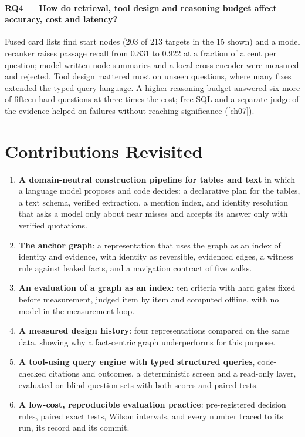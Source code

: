\paragraph{RQ4 --- How do retrieval, tool design and reasoning budget affect accuracy, cost and latency?} Fused card
lists find start nodes (203 of 213 targets in the 15 shown) and a model reranker raises passage recall from 0.831 to
0.922 at a fraction of a cent per question; model-written node summaries and a local cross-encoder were measured and
rejected. Tool design mattered most on unseen questions, where many fixes extended the typed query language. A higher
reasoning budget answered six more of fifteen hard questions at three times the cost; free SQL and a separate judge of
the evidence helped on failures without reaching significance (\cref{ch07}).

\section{Contributions Revisited}\label{sec:ch09-contributions}

\begin{enumerate}[nosep]
\item \textbf{A domain-neutral construction pipeline for tables and text} in which a language model proposes and code
decides: a declarative plan for the tables, a text schema, verified extraction, a mention index, and identity
resolution that asks a model only about near misses and accepts its answer only with verified quotations.
\item \textbf{The anchor graph}: a representation that uses the graph as an index of identity and evidence, with
identity as reversible, evidenced edges, a witness rule against leaked facts, and a navigation contract of five walks.
\item \textbf{An evaluation of a graph as an index}: ten criteria with hard gates fixed before measurement, judged item
by item and computed offline, with no model in the measurement loop.
\item \textbf{A measured design history}: four representations compared on the same data, showing why a fact-centric
graph underperforms for this purpose.
\item \textbf{A tool-using query engine with typed structured queries}, code-checked citations and outcomes, a
deterministic screen and a read-only layer, evaluated on blind question sets with both scores and paired tests.
\item \textbf{A low-cost, reproducible evaluation practice}: pre-registered decision rules, paired exact tests, Wilson
intervals, and every number traced to its run, its record and its commit.
\end{enumerate}

